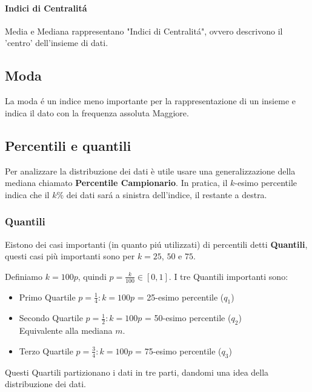 
\paragraph{Indici di Centralitá} Media e Mediana rappresentano "Indici di Centralitá", ovvero descrivono il 'centro' dell'insieme di dati.

\subsection*{Moda} La moda é un indice meno importante per la rappresentazione di un insieme e indica il dato con la frequenza assoluta Maggiore.

\subsection{Percentili e quantili}
Per analizzare la distribuzione dei dati è utile usare una generalizzazione della mediana chiamato \textbf{Percentile Campionario}.
In pratica, il $k$-esimo percentile indica che il $k\%$ dei dati sará a sinistra dell'indice, il restante a destra.

\subsubsection{Quantili}
Eistono dei casi importanti (in quanto piú utilizzati) di percentili detti \textbf{Quantili}, questi casi più importanti sono per $k = 25$, $50$ e $75$.

Definiamo $k = 100p$, quindi $p=\frac{k}{100} \in [0,1]$.
I tre Quantili importanti sono:
\begin{itemize} 
    \item Primo Quartile $p = \frac{1}{4}: k = 100p$ = 25-esimo percentile ($q_1$)
    \item Secondo Quartile $p = \frac{1}{2}: k = 100p$ = 50-esimo percentile ($q_2$) 
    \\ Equivalente alla  mediana $m$.
    \item Terzo Quartile $p = \frac{3}{4}: k = 100p$ = 75-esimo percentile ($q_3$)
\end{itemize}
Questi Quartili partizionano i dati in tre parti, dandomi una idea della distribuzione dei dati.
